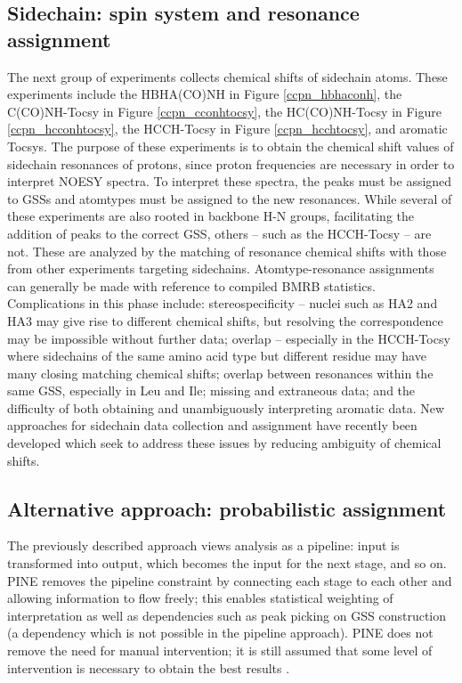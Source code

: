 \subsection{Sidechain: spin system and resonance assignment}
The next group of experiments collects chemical shifts of sidechain atoms.  
These experiments include 
the HBHA(CO)NH \cite{hbhaconh} in Figure \ref{ccpn_hbhaconh}, 
the C(CO)NH-Tocsy \cite{cconhtocsy} in Figure \ref{ccpn_cconhtocsy}, 
the HC(CO)NH-Tocsy \cite{hcconhtocsy} in Figure \ref{ccpn_hcconhtocsy}, 
the HCCH-Tocsy \cite{hcchtocsy} in Figure \ref{ccpn_hcchtocsy}, 
and aromatic Tocsys.  The purpose of these experiments is to 
obtain the chemical shift values of sidechain resonances of protons, since 
proton frequencies are necessary in order to interpret NOESY spectra.  To 
interpret these spectra, the peaks must be assigned to GSSs and atomtypes 
must be assigned to the new resonances. While several of these experiments 
are also rooted in backbone H-N groups, facilitating the addition of peaks 
to the correct GSS, others -- such as the HCCH-Tocsy -- are not.  These are 
analyzed by the matching of resonance chemical shifts with those from other 
experiments targeting sidechains.  Atomtype-resonance assignments can generally 
be made with reference to compiled BMRB statistics.  Complications in this 
phase include: stereospecificity -- nuclei such as HA2 and HA3 may give rise 
to different chemical shifts, but resolving the correspondence may be 
impossible without further data; overlap -- especially in the HCCH-Tocsy 
where sidechains of the same amino acid type but different residue may have 
many closing matching chemical shifts; overlap between resonances within the 
same GSS, especially in Leu and Ile; missing and extraneous data; and the 
difficulty of both obtaining and unambiguously interpreting aromatic data.  
New approaches for sidechain data collection and assignment have recently 
been developed \cite{mobli2010non, hiller2008apsy} which seek to address 
these issues by reducing ambiguity of chemical shifts.

\subsection{Alternative approach: probabilistic assignment}
The previously described approach views analysis as a pipeline: input is 
transformed into output, which becomes the input for the next stage, and so on.  
PINE \cite{pine} removes the pipeline constraint by connecting each stage to 
each other and allowing information to flow freely; this enables statistical 
weighting of interpretation as well as dependencies such as peak picking 
on GSS construction (a dependency which is not possible in the pipeline 
approach).  PINE does not remove the need for manual intervention; it is
still assumed that some level of intervention is necessary to obtain the
best results \cite{pine}.


